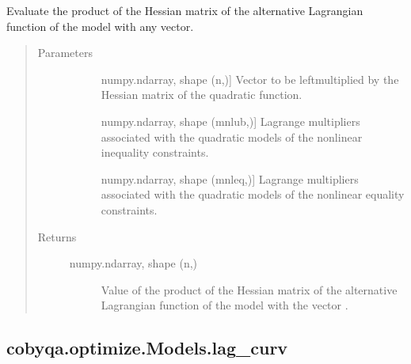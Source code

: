 \documentclass[letterpaper,10pt,english]{sphinxmanual}
\begin{document}
\begin{fulllineitems}
\begin{fulllineitems}
\label{\detokenize{refs/generated/cobyqa.optimize.Models.lag_alt_hessp:cobyqa.optimize.Models.lag_alt_hessp}}
\sphinxAtStartPar
Evaluate the product of the Hessian matrix of the alternative Lagrangian
function of the model with any vector.
\begin{quote}\begin{description}
\item[{Parameters}] \leavevmode\begin{description}
\item[{}] \leavevmode{[}numpy.ndarray, shape (n,){]}
\sphinxAtStartPar
Vector to be left\sphinxhyphen{}multiplied by the Hessian matrix of the quadratic
function.

\item[{}] \leavevmode{[}numpy.ndarray, shape (mnlub,){]}
\sphinxAtStartPar
Lagrange multipliers associated with the quadratic models of the
nonlinear inequality constraints.

\item[{}] \leavevmode{[}numpy.ndarray, shape (mnleq,){]}
\sphinxAtStartPar
Lagrange multipliers associated with the quadratic models of the
nonlinear equality constraints.

\end{description}

\item[{Returns}] \leavevmode\begin{description}
\item[{numpy.ndarray, shape (n,)}] \leavevmode
\sphinxAtStartPar
Value of the product of the Hessian matrix of the alternative
Lagrangian function of the model with the vector .

\end{description}

\end{description}\end{quote}

\end{fulllineitems}



\subsection{cobyqa.optimize.Models.lag\_curv}
\label{\detokenize{refs/generated/cobyqa.optimize.Models.lag_curv:cobyqa-optimize-models-lag-curv}}\label{\detokenize{refs/generated/cobyqa.optimize.Models.lag_curv::doc}}


\end{fulllineitems}
\end{document}
